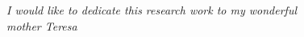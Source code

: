 \section*{ }

	\emph
	{
		I would like to dedicate this research work to my wonderful\\
		mother Teresa
	}  
 